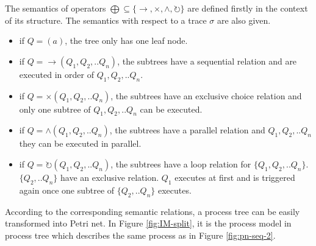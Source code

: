 \begin{definition} 
	The semantics of operators $\bigoplus \subseteq \{\rightarrow, \times, \land, \circlearrowright \}$ are defined firstly in the context of its structure. The semantics with respect to a trace $\sigma$ are also given. 
		\begin{itemize}
		\item if $Q=(a)$, the tree only has one leaf node. 
		\item if $Q= \rightarrow(Q_1 , Q_2 ,.. Q_n)$, the subtrees have a sequential relation and are executed in order of $Q_1,Q_2,..Q_n$. 
		\item if $Q= \times(Q_1 , Q_2 ,.. Q_n)$,  the subtrees have an exclusive choice relation and only one subtree of $Q_1,Q_2,..Q_n$  can be executed. 
		\item if $Q= \land (Q_1 , Q_2 ,.. Q_n)$,  the subtrees have a parallel relation and $Q_1,Q_2,..Q_n$ they can be executed in parallel.
		\item if $Q= \circlearrowright(Q_1 , Q_2 ,.. Q_n)$,  the subtrees have a loop relation for $\{Q_1,Q_2,..Q_n\}$. $\{Q_2,..Q_n\}$ have an exclusive relation. $Q_1$ executes at first and is triggered again once one subtree of $\{Q_2,..Q_n\}$ executes. 
	\end{itemize}
\end{definition}
According to the corresponding semantic relations,  a process tree can be easily transformed into Petri net. In Figure \ref{fig:IM-split}, it is the process model in process tree which describes the same process as in Figure \ref{fig:pn-seq-2}. 

